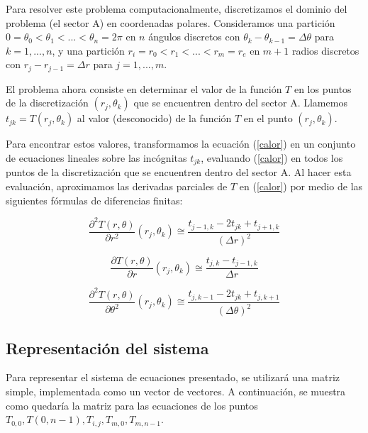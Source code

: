 \medskip

Para resolver este problema computacionalmente, discretizamos el dominio del problema (el sector A) en coordenadas polares. Consideramos una partici\'on $0 = \theta_0 < \theta_1 < ... < \theta_n = 2\pi$ en $n$ \'angulos discretos con $\theta_k-\theta_{k-1} = \Delta\theta$ para $k = 1,...,n$, y una partici\'on $r_i = r_0 < r_1 < ... < r_m = r_e$ en $m+1$ radios discretos con $r_j - r_{j-1} = \Delta r$ para $j = 1,...,m$.

\medskip

El problema ahora consiste en determinar el valor de la funci\'on $T$ en los puntos de la discretizaci\'on $(r_j,\theta_k)$ que se encuentren dentro del sector A. Llamemos $t_{jk} = T(r_j,\theta_k)$ al valor (desconocido) de la funci\'on $T$ en el punto $(r_j,\theta_k)$.

\medskip

Para encontrar estos valores, transformamos la ecuaci\'on (\ref{calor}) en un conjunto de ecuaciones lineales sobre las inc\'ognitas $t_{jk}$, evaluando (\ref{calor}) en todos los puntos de la discretizaci\'on que se encuentren dentro del sector A. Al hacer esta evaluaci\'on, aproximamos las derivadas parciales de $T$ en (\ref{calor}) por medio de las siguientes f\'ormulas de diferencias finitas:


\begin{equation}
\frac{\partial^2T(r,\theta)}{\partial r^2}(r_j,\theta_k) \cong \frac{t_{j-1,k}-2t_{jk}+t_{j+1,k}}{(\Delta r)^2}
\end{equation}

\begin{equation}
\frac{\partial T(r,\theta)}{\partial r}(r_j,\theta_k) \cong \frac{t_{j,k}-t_{j-1,k}}{\Delta r}
\end{equation}

\begin{equation}
\frac{\partial^2T(r,\theta)}{\partial \theta^2}(r_j,\theta_k) \cong \frac{t_{j,k-1}-2t_{jk}+t_{j,k+1}}{(\Delta \theta)^2}
\end{equation}


\subsection{Representación del sistema}

Para representar el sistema de ecuaciones presentado, se utilizará una matriz simple, implementada como un vector de vectores. A continuación, se muestra como quedaría la matriz para las ecuaciones de los puntos $T_{0,0}, T(0, n-1), T_{i,j}, T_{m,0}, T_{m,n-1}$.

